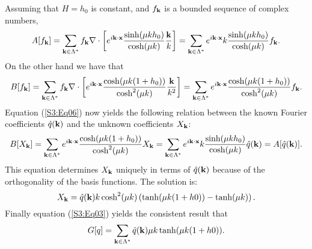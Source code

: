 Assuming that $H = h_0$ is constant, and $f_{\bold{k}}$ is a bounded sequence of complex numbers,
\begin{equation}
A[f_{\bold{k}}] = \sum_{\bold{k}\in\Lambda^*} f_{\bold{k}}\nabla \cdot \left[ e^{i\bold{k}\cdot\bold{x}} \frac{\sinh(\mu k h_0)}{\cosh(\mu k)}\frac{\bold{k}}{k}\right] = \sum_{\bold{k}\in\Lambda^*} e^{i\bold{k}\cdot\bold{x}} k\frac{\sinh(\mu k h_0)}{\cosh(\mu k)} f_{\bold{k}}.
\end{equation}
On the other hand we have that
\begin{equation}
B[f_{\bold{k}}] = \sum_{\bold{k}\in\Lambda^*} f_{\bold{k}}\nabla \cdot \left[ e^{i\bold{k}\cdot\bold{x}} \frac{\cosh(\mu k (1+h_0))}{\cosh^2(\mu k)}\frac{\bold{k}}{k^2}\right] = \sum_{\bold{k}\in\Lambda^*} e^{i\bold{k}\cdot\bold{x}} \frac{\cosh(\mu k (1+h_0))}{\cosh^2(\mu k)} f_{\bold{k}}.
\end{equation}
Equation (\ref{S3:Eq06}) now yields the following relation between the known Fourier coefficients $\hat{q}(\bold{k})$ and the unknown coefficients $X_{\bold{k}}$:
\begin{equation}
B[X_{\bold{k}}] = \sum_{\bold{k}\in\Lambda^*} e^{i\bold{k}\cdot\bold{x}} \frac{\cosh(\mu k (1+h_0))}{\cosh^2(\mu k)} X_{\bold{k}} = \sum_{\bold{k}\in\Lambda^*} e^{i\bold{k}\cdot\bold{x}} k\frac{\sinh(\mu k h_0)}{\cosh(\mu k)} \hat{q}(\bold{k}) = A[\hat{q}(\bold{k})].
\end{equation}
This equation determines $X_{\bold{k}}$ uniquely in terms of $\hat{q}(\bold{k})$ because of the orthogonality of the basis functions. The solution is:
\begin{equation}
X_{\bold{k}} = \hat{q}(\bold{k})k\cosh^2(\mu k)\left(\tanh(\mu k (1+h0))-\tanh(\mu k )\right).
\end{equation}
Finally equation (\ref{S3:Eq03}) yields the consistent result that
\begin{equation}
G[q] = \sum_{\bold{k}\in\Lambda^*}\hat{q}(\bold{k})\mu k\tanh(\mu k (1+h0)).
\end{equation}


